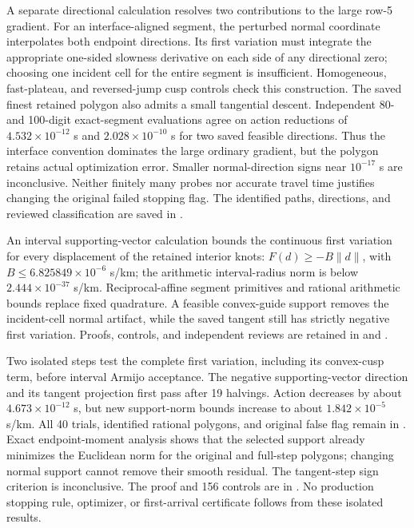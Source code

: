 A separate directional calculation resolves two contributions to the large
row-5 gradient. For an interface-aligned segment, the perturbed normal
coordinate interpolates both endpoint directions. Its first variation must
integrate the appropriate one-sided slowness derivative on each side of any
directional zero; choosing one incident cell for the entire segment is
insufficient. Homogeneous, fast-plateau, and reversed-jump cusp controls check
this construction. The saved finest retained polygon also admits a small
tangential descent. Independent 80- and 100-digit exact-segment evaluations
agree on action reductions of $4.532\times10^{-12}$ s and
$2.028\times10^{-10}$ s for two saved feasible directions. Thus the interface
convention dominates the large ordinary gradient, but the polygon retains
actual optimization error. Smaller normal-direction signs near $10^{-17}$ s
are inconclusive. Neither finitely many probes nor accurate travel time
justifies changing the original failed stopping flag. The identified paths,
directions, and reviewed classification are saved in
.

An interval supporting-vector calculation bounds the continuous first variation
for every displacement of the retained interior knots:
$F(d)\geq-B\lVert d\rVert$, with $B\leq6.825849\times10^{-6}$ s/km;
the arithmetic interval-radius norm is below $2.444\times10^{-37}$ s/km.
Reciprocal-affine segment primitives and rational arithmetic bounds replace
fixed quadrature. A feasible convex-guide support removes the incident-cell
normal artifact, while the saved tangent still has strictly negative first
variation. Proofs, controls, and independent reviews are retained in
 and
.

Two isolated steps test the complete first variation, including its convex-cusp
term, before interval Armijo acceptance. The negative supporting-vector
direction and its tangent projection first pass after 19 halvings. Action
decreases by about $4.673\times10^{-12}$ s, but new support-norm bounds increase
to about $1.842\times10^{-5}$ s/km. All 40 trials, identified rational polygons,
and original false flag remain in
.
Exact endpoint-moment analysis shows that the selected support already minimizes
the Euclidean norm for the original and full-step polygons; changing normal
support cannot remove their smooth residual. The tangent-step sign criterion
is inconclusive. The proof and 156 controls are in
. No production stopping rule,
optimizer, or first-arrival certificate follows from these isolated results.

